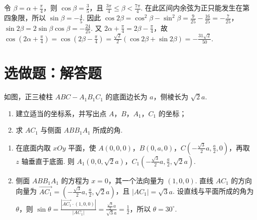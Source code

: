 \begin{solution}
令 \(\beta=\alpha+\frac{\pi}{4}\)，则 \(\cos\beta=\frac{3}{5}\)，且 \(\frac{3\pi}{4}\leqslant\beta<\frac{7\pi}{4}\). 在此区间内余弦为正只能发生在第四象限，所以 \(\sin\beta=-\frac{4}{5}\). 因此
\(\cos2\beta=\cos^{2}\beta-\sin^{2}\beta=\frac{9}{25}-\frac{16}{25}=-\frac{7}{25}\)，\(\sin2\beta=2\sin\beta\cos\beta=-\frac{24}{25}\). 又 \(2\alpha+\frac{\pi}{4}=2\beta-\frac{\pi}{4}\)，故
\(\cos\left(2\alpha+\frac{\pi}{4}\right)=\cos\left(2\beta-\frac{\pi}{4}\right)=\frac{\sqrt{2}}{2}\left(\cos2\beta+\sin2\beta\right)=-\frac{31\sqrt{2}}{50}\).
\end{solution}

\section{选做题：解答题}
\begin{problem}[甲]
如图，正三棱柱 \(ABC - A_{1}B_{1}C_{1}\) 的底面边长为 \(a\)，侧棱长为 \(\sqrt{2}a\).

\begin{enumerate}
\item 建立适当的坐标系，并写出点 \(A\)，\(B\)，\(A_{1}\)，\(C_{1}\) 的坐标；
\item 求 \(AC_{1}\) 与侧面 \(ABB_{1}A_{1}\) 所成的角.
\end{enumerate}

\FloatBarrier
\end{problem}

\begin{solution}
\begin{enumerate}
\item 在底面内取 \(xOy\) 平面，使 \(A(0,0,0)\)，\(B(0,a,0)\)，\(C\left(-\frac{\sqrt{3}}{2}a,\frac{a}{2},0\right)\)，再取 \(z\) 轴垂直于底面. 则 \(A_{1}(0,0,\sqrt{2}a)\)，\(C_{1}\left(-\frac{\sqrt{3}}{2}a,\frac{a}{2},\sqrt{2}a\right)\).
\item 侧面 \(ABB_{1}A_{1}\) 的方程为 \(x=0\)，其一个法向量为 \((1,0,0)\). 直线 \(AC_{1}\) 的方向向量为 \(\overrightarrow{AC_{1}}=\left(-\frac{\sqrt{3}}{2}a,\frac{a}{2},\sqrt{2}a\right)\)，且 \(|AC_{1}|=\sqrt{3}a\). 设直线与平面所成的角为 \(\theta\)，则
\(\sin\theta=\frac{|\overrightarrow{AC_{1}}\cdot(1,0,0)|}{|AC_{1}|}=\frac{\frac{\sqrt{3}}{2}a}{\sqrt{3}a}=\frac{1}{2}\)，所以 \(\theta=30^{\circ}\).
\end{enumerate}
\end{solution}

